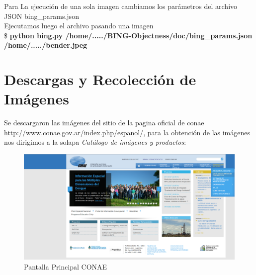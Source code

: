 Para La ejecución de una sola imagen cambiamos los parámetros del archivo JSON bing\_params.json \\
Ejecutamos luego el archivo pasando una imagen\\
\$ \textbf{python bing.py /home/...../BING-Objectness/doc/bing\_params.json /home/...../bender.jpeg}

\section{Descargas y Recolección de Imágenes}
Se descargaron las imágenes del sitio de la pagina oficial de \ac{conae} \url{http://www.conae.gov.ar/index.php/espanol/}, para la obtención de las imágenes nos dirigimos a
la solapa \textit{Catálogo de imágenes y productos}:

\begin{figure}[H]
 \centering
  \includegraphics[scale=0.2,keepaspectratio=true,clip=true]{imagenes/Apendice/conaepag.png}
  \caption{Pantalla Principal CONAE}
\end{figure}

